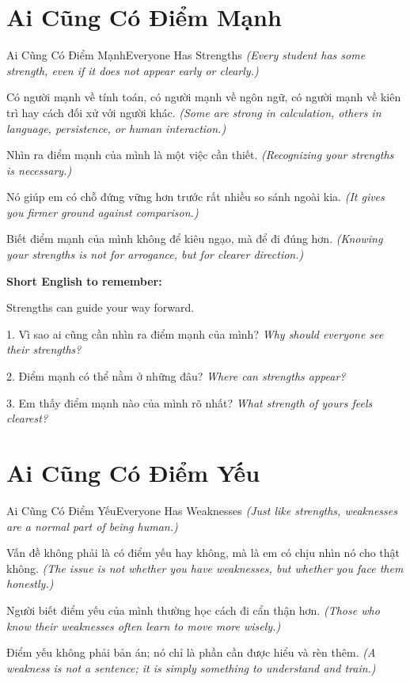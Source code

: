 \section{Ai Cũng Có Điểm Mạnh}
\begin{truyen}{Ai Cũng Có Điểm Mạnh}{Everyone Has Strengths}
\textit{(Every student has some strength, even if it does not appear early or clearly.)}

Có người mạnh về tính toán, có người mạnh về ngôn ngữ, có người mạnh về kiên trì hay cách đối xử với người khác.
\textit{(Some are strong in calculation, others in language, persistence, or human interaction.)}

Nhìn ra điểm mạnh của mình là một việc cần thiết.
\textit{(Recognizing your strengths is necessary.)}

Nó giúp em có chỗ đứng vững hơn trước rất nhiều so sánh ngoài kia.
\textit{(It gives you firmer ground against comparison.)}
\end{truyen}

\begin{baihoc}
Biết điểm mạnh của mình không để kiêu ngạo, mà để đi đúng hơn.
\textit{(Knowing your strengths is not for arrogance, but for clearer direction.)}
\end{baihoc}

\begin{ghinhoanh}
\textbf{Short English to remember:}

Strengths can guide your way forward.

\end{ghinhoanh}

\begin{tuhocnhanh}
1. Vì sao ai cũng cần nhìn ra điểm mạnh của mình? \textit{Why should everyone see their strengths?}

2. Điểm mạnh có thể nằm ở những đâu? \textit{Where can strengths appear?}

3. Em thấy điểm mạnh nào của mình rõ nhất? \textit{What strength of yours feels clearest?}
\end{tuhocnhanh}
\ngancach

\section{Ai Cũng Có Điểm Yếu}
\begin{truyen}{Ai Cũng Có Điểm Yếu}{Everyone Has Weaknesses}
\textit{(Just like strengths, weaknesses are a normal part of being human.)}

Vấn đề không phải là có điểm yếu hay không, mà là em có chịu nhìn nó cho thật không.
\textit{(The issue is not whether you have weaknesses, but whether you face them honestly.)}

Người biết điểm yếu của mình thường học cách đi cẩn thận hơn.
\textit{(Those who know their weaknesses often learn to move more wisely.)}

Điểm yếu không phải bản án; nó chỉ là phần cần được hiểu và rèn thêm.
\textit{(A weakness is not a sentence; it is simply something to understand and train.)}
\end{truyen}

